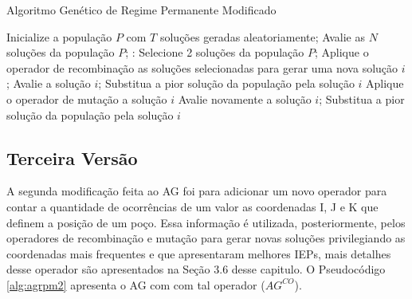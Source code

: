 \begin{algorithm}[H]
  \caption{Algoritmo Genético de Regime Permanente Modificado}
  \label{alg:agrpm}
  \begin{algorithmic}
    \State Inicialize a população $P$ com $T$ soluções geradas aleatoriamente;
    \State Avalie as $N$ soluções da população $P$;
       \State:
        \State Selecione 2 soluções da população $P$;
        \State Aplique o operador de recombinação as soluções selecionadas para gerar uma nova solução $i$;
        \State Avalie a solução $i$;
          \State Substitua a pior solução da população pela solução $i$	
        \Else
          \State Aplique o operador de mutação a solução $i$	
          \State Avalie novamente a solução $i$;
            \State Substitua a pior solução da população pela solução $i$
          \EndIf
        \EndIf
      \EndFor
    \EndWhile
  \end{algorithmic}
\end{algorithm}

\subsection{Terceira Versão}

A segunda modificação feita ao AG foi para adicionar um novo operador para contar a quantidade de ocorrências de um valor as coordenadas I, J e K que definem a posição de um poço. Essa informação é utilizada, posteriormente, pelos operadores de recombinação e mutação para gerar novas soluções privilegiando as coordenadas mais frequentes e que apresentaram melhores IEPs, mais detalhes desse operador são apresentados na Seção 3.6 desse capitulo. O Pseudocódigo \ref{alg:agrpm2} apresenta o AG com com tal operador ($AG^{CO}$).

